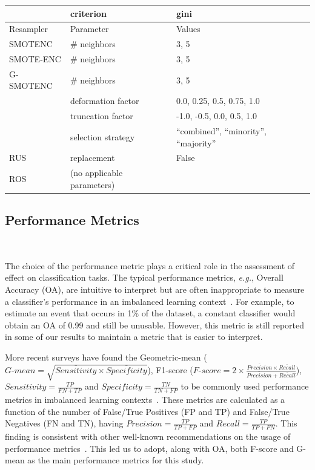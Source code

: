\documentclass[parskip=full]{scrartcl}
\begin{document}
\begin{table}
\begin{tabular}{lll}
                        & criterion                        & gini                           \\
		\toprule
		Resampler       & Parameter                        & Values                         \\
		\midrule
		SMOTENC         & \# neighbors                     & 3, 5                           \\
		SMOTE-ENC       & \# neighbors                     & 3, 5                           \\
		G-SMOTENC       & \# neighbors                     & 3, 5                           \\
                        & deformation factor               & 0.0, 0.25, 0.5, 0.75, 1.0      \\
                        & truncation factor                & -1.0, -0.5, 0.0, 0.5, 1.0      \\
                        & selection strategy               & ``combined'',
                        ``minority'', ``majority''\\
		RUS             & replacement                      & False                          \\
		ROS             & (no applicable parameters)       &                                \\
		\bottomrule
	\end{tabular}
\end{table}

\subsection{Performance Metrics}~\label{sec:performance_metrics}

The choice of the performance metric plays a critical role in the assessment
of effect on classification tasks. The typical performance metrics,
\textit{e.g.}, Overall Accuracy (OA), are intuitive to interpret but are often
inappropriate to measure a classifier's performance in an imbalanced learning
context~\cite{sun2009classification}. For example, to estimate an event that
occurs in 1\% of the dataset, a constant classifier would obtain an OA of 0.99
and still be unusable. However, this metric is still reported in some of our
results to maintain a metric that is easier to interpret.

More recent surveys have found the Geometric-mean ($\textit{G-mean} =
\sqrt{\overline{Sensitivity} \times \overline{Specificity}}$), F1-score
($\textit{F-score}=2\times\frac{\overline{Precision} \times
\overline{Recall}}{\overline{Precision} + \overline{Recall}}$), $Sensitivity =
\frac{TP}{FN+TP}$ and $Specificity = \frac{TN}{TN + FP}$ to be commonly used
performance metrics in imbalanced learning contexts~\cite{rout2018handling}.
These metrics are calculated as a function of the number of False/True
Positives (FP and TP) and False/True Negatives (FN and TN), having
$Precision = \frac{TP}{TP+FP}$ and $Recall = \frac{TP}{TP+FN}$.
This finding is consistent with other well-known recommendations on the usage
of performance metrics~\cite{jeni2013facing}. This led us to adopt, along with
OA, both F-score and G-mean as the main performance metrics for this study. 
\end{document}
